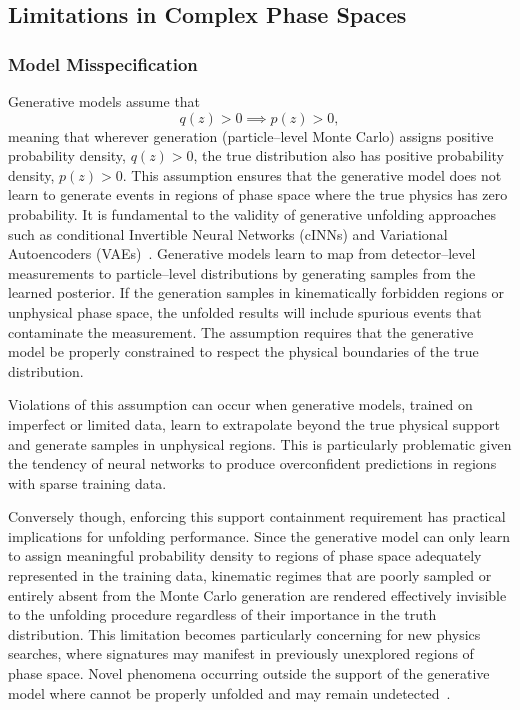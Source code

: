     \subsection{Limitations in Complex Phase Spaces}  
        \subsubsection{Model Misspecification}  
            Generative models assume that \[q(z) > 0 \implies p(z) > 0,\] meaning that wherever generation (particle--level Monte Carlo) assigns positive probability density, \(q(z) > 0\), the true distribution also has positive probability density, \(p(z) > 0\).
            This assumption ensures that the generative model does not learn to generate events in regions of phase space where the true physics has zero probability.
            It is fundamental to the validity of generative unfolding approaches such as conditional Invertible Neural Networks (cINNs) and Variational Autoencoders (VAEs)~\cite{Shmakov2025FullDiffusion}.
            Generative models learn to map from detector--level measurements to particle--level distributions by generating samples from the learned posterior.
            If the generation samples in kinematically forbidden regions or unphysical phase space, the unfolded results will include spurious events that contaminate the measurement.
            The assumption requires that the generative model be properly constrained to respect the physical boundaries of the true distribution.
            
            Violations of this assumption can occur when generative models, trained on imperfect or limited data, learn to extrapolate beyond the true physical support and generate samples in unphysical regions.
            This is particularly problematic given the tendency of neural networks to produce overconfident predictions in regions with sparse training data.
            
            Conversely though, enforcing this support containment requirement has practical implications for unfolding performance.
            Since the generative model can only learn to assign meaningful probability density to regions of phase space adequately represented in the training data, kinematic regimes that are poorly sampled or entirely absent from the Monte Carlo generation are rendered effectively invisible to the unfolding procedure regardless of their importance in the truth distribution.
            This limitation becomes particularly concerning for new physics searches, where signatures may manifest in previously unexplored regions of phase space.
            Novel phenomena occurring outside the support of the generative model where cannot be properly unfolded and may remain undetected~\cite{Amsler2008MonteTechniques}. 
            
